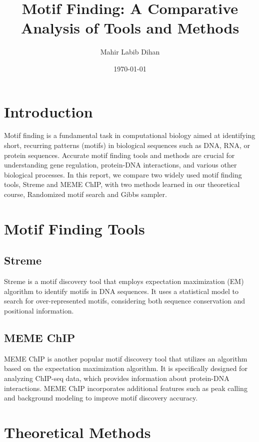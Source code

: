 \documentclass{article}
\title{Motif Finding: A Comparative Analysis of Tools and Methods}
\author{Mahir Labib Dihan}
\date{\today}
\begin{document}
\maketitle

\section{Introduction}

Motif finding is a fundamental task in computational biology aimed at identifying short, recurring patterns (motifs) in biological sequences such as DNA, RNA, or protein sequences. Accurate motif finding tools and methods are crucial for understanding gene regulation, protein-DNA interactions, and various other biological processes. In this report, we compare two widely used motif finding tools, Streme and MEME ChIP, with two methods learned in our theoretical course, Randomized motif search and Gibbs sampler.

\section{Motif Finding Tools}

\subsection{Streme}

Streme is a motif discovery tool that employs expectation maximization (EM) algorithm to identify motifs in DNA sequences. It uses a statistical model to search for over-represented motifs, considering both sequence conservation and positional information.

\subsection{MEME ChIP}

MEME ChIP is another popular motif discovery tool that utilizes an algorithm based on the expectation maximization algorithm. It is specifically designed for analyzing ChIP-seq data, which provides information about protein-DNA interactions. MEME ChIP incorporates additional features such as peak calling and background modeling to improve motif discovery accuracy.

\section{Theoretical Methods}
\end{document}
